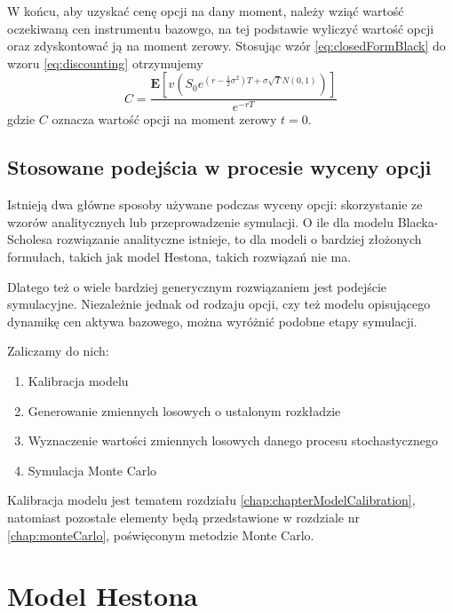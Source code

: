 \documentclass{pracamgr}
\begin{document}
W końcu, aby uzyskać cenę opcji na dany moment, należy wziąć wartość oczekiwaną cen instrumentu bazowgo, na tej podstawie wyliczyć wartość opcji oraz zdyskontować ją na moment zerowy. Stosując wzór \ref{eq:closedFormBlack} do wzoru \ref{eq:discounting} otrzymujemy
\begin{equation}
  C = \frac{\mathbf{E}[v(S_0 e^{(r - \frac{1}{2} \sigma^2)T+\sigma \sqrt{T} N(0,1)})]}{e^{-rT}}
\end{equation}
gdzie $C$ oznacza wartość opcji na moment zerowy $t = 0$.



\section{Stosowane podejścia w procesie wyceny opcji} %
\label{sec:}

Istnieją dwa główne sposoby używane podczas wyceny opcji: skorzystanie ze wzorów analitycznych lub przeprowadzenie symulacji. O ile dla modelu Blacka-Scholesa rozwiązanie analityczne istnieje, to dla modeli o bardziej złożonych formułach, takich jak model Hestona, takich rozwiązań nie ma. 

Dlatego też o wiele bardziej generycznym rozwiązaniem jest podejście symulacyjne.
Niezależnie jednak od rodzaju opcji, czy też modelu opisującego dynamikę cen aktywa bazowego, można wyróżnić podobne etapy symulacji. 

Zaliczamy do nich:
\begin{enumerate}
  \item Kalibracja modelu
  \item Generowanie zmiennych losowych o ustalonym rozkładzie
  \item Wyznaczenie wartości zmiennych losowych danego procesu stochastycznego
  \item Symulacja Monte Carlo
\end{enumerate}

Kalibracja modelu jest tematem rozdziału 
\ref{chap:chapterModelCalibration}, natomiast pozostałe elementy będą przedstawione w rozdziale nr \ref{chap:monteCarlo}, poświęconym metodzie Monte Carlo.





%
%
\chapter{Model Hestona}
\label{chap:hestonModel}
\end{document}
